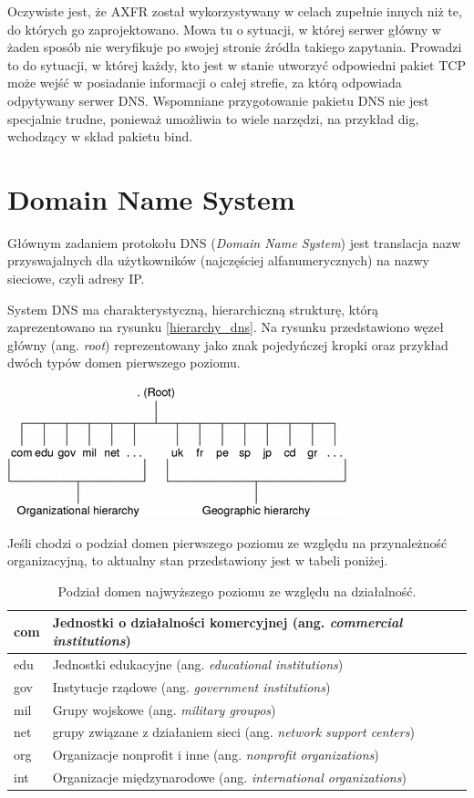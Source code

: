 Oczywiste jest, że AXFR został wykorzystywany w celach zupełnie innych niż te, do których go zaprojektowano. Mowa tu o sytuacji, w której serwer główny w żaden sposób nie weryfikuje po swojej stronie źródła takiego zapytania. Prowadzi to do sytuacji, w której każdy, kto jest w stanie utworzyć odpowiedni pakiet TCP może wejść w posiadanie informacji o całej strefie, za którą odpowiada odpytywany serwer DNS. Wspomniane przygotowanie pakietu DNS nie jest specjalnie trudne, ponieważ umożliwia to wiele narzędzi, na przykład dig, wchodzący w skład pakietu bind. 

\section{Domain Name System}
Głównym zadaniem protokołu DNS (\textit{Domain Name System}) jest translacja nazw przyswajalnych dla użytkowników (najczęściej alfanumerycznych) na nazwy sieciowe, czyli adresy IP. 

System DNS ma charakterystyczną, hierarchiczną strukturę, którą zaprezentowano na rysunku \ref{hierarchy_dns}. Na rysunku przedstawiono węzeł główny (ang. \textit{root}) reprezentowany jako znak pojedyńczej kropki oraz przykład dwóch typów domen pierwszego poziomu.

\begin{center}
	\includegraphics[scale=1]{image/hierarchy_dns}\label{hierarchy_dns}
\end{center}

Jeśli chodzi o podział domen pierwszego poziomu ze względu na przynależność organizacyjną, to aktualny stan przedstawiony jest w tabeli poniżej.

\begin{table}[]
	\centering
	\caption{Podział domen najwyższego poziomu ze względu na działalność.}
	\label{my-label}
	\begin{tabular}{ll}
		\hline
		com & Jednostki o działalności komercyjnej (ang. \textit{commercial institutions}) \\
		\hline
		edu & Jednostki edukacyjne (ang. \textit{educational institutions})\\
		\hline
		gov & Instytucje rządowe (ang. \textit{government institutions}) \\
		\hline
		mil & Grupy wojskowe (ang. \textit{military groupos}) \\
		\hline
		net & grupy związane z działaniem sieci (ang. \textit{network support centers}) \\
		\hline
		org & Organizacje nonprofit i inne (ang. \textit{nonprofit organizations}) \\
		\hline
		int & Organizacje międzynarodowe (ang. \textit{international organizations}) \\
		\hline 
	\end{tabular}
\end{table}

